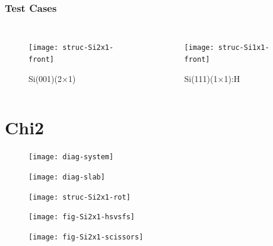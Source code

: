 \documentclass{beamer}
\begin{document}
\begin{frame}
\frametitle{Test Cases}
\begin{columns}
\begin{figure}
\centering
\texttt{[image: struc-Si2x1-front]}
\caption{Si(001)(2$\times$1)}
\end{figure}
\begin{figure}
\centering
\texttt{[image: struc-Si1x1-front]}
\caption{Si(111)(1$\times$1):H}
\end{figure}
\end{columns}
\end{frame}



\section{Chi2}

\begin{frame}
\begin{figure}
\centering
\texttt{[image: diag-system]}
\end{figure}
\end{frame}

\begin{frame}
\begin{figure}
\centering
\texttt{[image: diag-slab]}
\end{figure}
\end{frame}

\begin{frame}
\begin{figure}
\centering
\texttt{[image: struc-Si2x1-rot]}
\end{figure}
\end{frame}

\begin{frame}
\begin{figure}
\centering
\texttt{[image: fig-Si2x1-hsvsfs]}
\end{figure}
\end{frame}

\begin{frame}
\begin{figure}
\centering
\texttt{[image: fig-Si2x1-scissors]}
\end{figure}
\end{frame}
\end{document}
